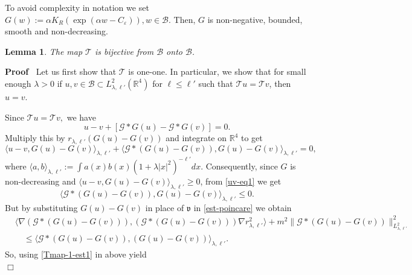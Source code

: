 \documentclass{article}
\newcommand{\assign}{:=}
\newcommand{\comma}{{,}}
\newenvironment{proof}{\noindent\textbf{Proof\ }}{\hspace*{\fill}$\Box$\medskip}
\newtheorem{lemma}{Lemma}
\begin{document}
To avoid complexity in notation we set $G (w) \assign \alpha K_R (\exp
(\alpha w - C_{\varepsilon})), w \in \mathcal{B}$. Then, $G$ is non-negative, bounded, smooth and non-decreasing.
%
\begin{lemma}\label{lem-T-bijectivity}
The map $\mathcal{T}$ is bijective from $\mathcal{B}$ onto $\mathcal{B}$. 
\end{lemma}
%
\begin{proof}
  Let us first show that $\mathcal{T}$ is one-one. In particular, we show that
  for small enough $\lambda > 0$ if $u, v \in \mathcal{B} \subset L_{\lambda,
  \ell'}^2 (\mathbb{R}^4)$ for $\ell \leqslant \ell'$ such that $\mathcal{T}u
  =\mathcal{T}v$, then $u = v$.
  
  Since $\mathcal{T}u =\mathcal{T}v,$ we have
  \begin{equation} \label{Tmap-1}
      u - v + [\mathcal{G} \ast G (u) -\mathcal{G} \ast G (v)] = 0.    
  \end{equation}
  Multiply this by $r_{\lambda, \ell'} (G (u) - G (v))$ and integrate on
  $\mathbb{R}^4$ to get
  \begin{equation}
      \langle u - v, G (u) - G (v) \rangle_{\lambda, \ell'} +
        \langle \mathcal{G} \ast (G (u) - G (v)), G (u) - G (v)
    \rangle_{\lambda, \ell'} = 0, \label{uv-eq1}
  \end{equation}
  where $\langle a, b \rangle_{\lambda, \ell'} \assign \int a (x) b (x) (1 + \lambda | x |^2)^{- \ell'} d x.$
  Consequently, since $G$ is non-decreasing and $\langle u - v, G (u) - G (v)
  \rangle_{\lambda, \ell'} \geqslant 0$, from \eqref{uv-eq1} we get
  \begin{equation}
    \langle \mathcal{G} \ast (G (u) - G (v)), G (u) - G (v) \rangle_{\lambda
    \comma \ell'} \leqslant 0. \label{Tmap-1-est1}
  \end{equation}
  But by substituting $G (u) - G (v)$ in place of $\mathfrak{v}$ in   \eqref{est-poincare} we obtain
  \begin{align}
      & \langle \nabla (\mathcal{G} \ast (G (u) - G (v))), (\mathcal{G} \ast
      (G (u) - G (v))) \nabla r_{\lambda, \ell'}^2 \rangle
      + m^2 \| \mathcal{G} \ast (G (u) - G (v)) \|_{L^2_{\lambda, \ell'}
      }^2 \nonumber \\
      & \quad \leq \langle \mathcal{G} \ast (G (u) - G (v)), (G (u) - G (v)) \rangle_{\lambda, \ell'} .
    \label{est-poincare-1}
  \end{align}
  So, using \eqref{Tmap-1-est1} in above yield
  \begin{equation}

\end{equation}
\end{proof}
\end{document}
